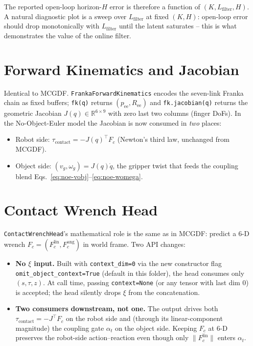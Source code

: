 \documentclass[11pt]{article}
\begin{document}
The reported open-loop horizon-$H$ error is therefore a function of
$(K, L_{\mathrm{filter}}, H)$.  A natural diagnostic plot is a sweep
over $L_{\mathrm{filter}}$ at fixed $(K, H)$: open-loop error should
drop monotonically with $L_{\mathrm{filter}}$ until the latent
saturates -- this is what demonstrates the value of the online
filter.

\section{Forward Kinematics and Jacobian}

Identical to MCGDF.  \texttt{FrankaForwardKinematics} encodes the
seven-link Franka chain as fixed buffers; \texttt{fk(q)} returns
$(p_{\mathrm{ee}}, R_{\mathrm{ee}})$ and \texttt{fk.jacobian(q)}
returns the geometric Jacobian $J(q) \in \mathbb{R}^{6\times 9}$ with
zero last two columns (finger DoFs).  In the No-Object-Euler model
the Jacobian is now consumed in \emph{two} places:
\begin{itemize}
  \item Robot side: $\tau_{\mathrm{contact}} = -J(q)^\top F_c$
    (Newton's third law, unchanged from MCGDF).
  \item Object side: $(v_g, \omega_g) = J(q)\dot q$, the gripper
    twist that feeds the coupling blend
    Eqs.~\eqref{eq:noe-vobj}--\eqref{eq:noe-womega}.
\end{itemize}

\section{Contact Wrench Head}
\label{sec:contact-head}

\texttt{ContactWrenchHead}'s mathematical role is the same as in
MCGDF: predict a 6-D wrench $F_c = (F_c^{\mathrm{lin}},
F_c^{\mathrm{ang}})$ in world frame.  Two API changes:
\begin{itemize}
  \item \textbf{No $\xi$ input.}  Built with
    \texttt{context\_dim=0} via the new constructor flag
    \texttt{omit\_object\_context=True} (default in this folder),
    the head consumes only $(s, \tau, z)$.  At call time, passing
    \texttt{context=None} (or any tensor with last dim 0) is
    accepted; the head silently drops $\xi$ from the concatenation.
  \item \textbf{Two consumers downstream, not one.}  The output
    drives both $\tau_{\mathrm{contact}} = -J^\top F_c$ on the robot
    side and (through its linear-component magnitude) the coupling
    gate $\alpha_t$ on the object side.  Keeping $F_c$ at 6-D
    preserves the robot-side action--reaction even though only
    $\|F_c^{\mathrm{lin}}\|$ enters $\alpha_t$.
\end{itemize}
\end{document}
